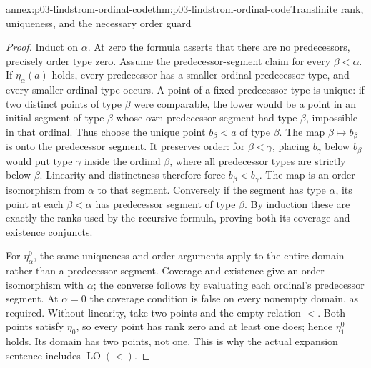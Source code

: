 \begin{annexitem}{annex:p03-lindstrom-ordinal-code}{thm:p03-lindstrom-ordinal-code}{Transfinite rank, uniqueness, and the necessary order guard}
\begin{proof}
Induct on \(\alpha\). At zero the formula asserts that there are no
predecessors, precisely order type zero. Assume the predecessor-segment
claim for every \(\beta<\alpha\). If \(\eta_\alpha(a)\) holds,
every predecessor has a smaller ordinal predecessor type, and every smaller
ordinal type occurs. A point of a fixed predecessor type is unique: if two
distinct points of type \(\beta\) were comparable, the lower would be a
point in an initial segment of type \(\beta\) whose own predecessor
segment had type \(\beta\), impossible in that ordinal. Thus choose
the unique point \(b_\beta<a\) of type \(\beta\). The map
\(\beta\mapsto b_\beta\) is onto the predecessor segment.
It preserves order: for \(\beta<\gamma\), placing \(b_\gamma\)
below \(b_\beta\) would put type \(\gamma\) inside the ordinal
\(\beta\), where all predecessor types are strictly below \(\beta\).
Linearity and distinctness therefore force \(b_\beta<b_\gamma\).
The map is an order isomorphism from \(\alpha\) to that segment.
Conversely if the segment has type \(\alpha\), its point at each
\(\beta<\alpha\) has predecessor segment of type \(\beta\).
By induction these are exactly the ranks used by the recursive formula,
proving both its coverage and existence conjuncts.

For \(\eta^0_\alpha\), the same uniqueness and order arguments apply
to the entire domain rather than a predecessor segment. Coverage and
existence give an order isomorphism with \(\alpha\); the converse
follows by evaluating each ordinal's predecessor segment. At \(\alpha=0\)
the coverage condition is false on every nonempty domain, as required.
Without linearity, take two points and the empty relation \(<\).
Both points satisfy \(\eta_0\), so every point has rank zero and at
least one does; hence \(\eta^0_1\) holds. Its domain has two points,
not one. This is why the actual expansion sentence includes
\(\operatorname{LO}(<)\).
\end{proof}
\end{annexitem}

